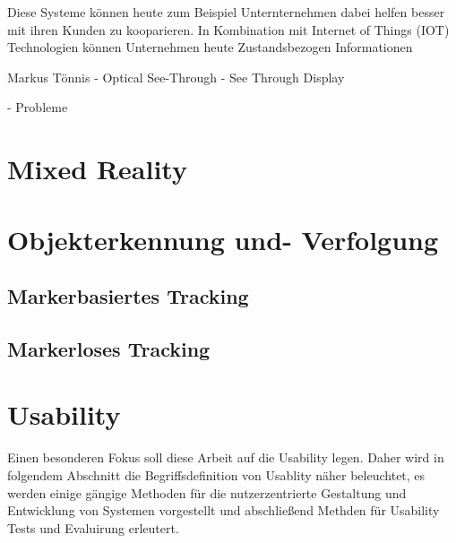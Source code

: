 Diese Systeme können heute zum Beispiel Unternternehmen dabei helfen besser mit ihren Kunden zu kooparieren. In Kombination mit Internet of Things (IOT) Technologien können Unternehmen heute
Zustandsbezogen Informationen  


Markus Tönnis
- Optical See-Through
- See Through Display


-  Probleme

\section{Mixed Reality}



\section{Objekterkennung und- Verfolgung}



\subsection{Markerbasiertes Tracking}



\subsection{Markerloses Tracking}



\section{Usability}

Einen besonderen Fokus soll diese Arbeit auf die Usability legen. Daher wird in folgendem Abschnitt die Begriffsdefinition von Usablity näher beleuchtet, es werden einige 
gängige Methoden für die nutzerzentrierte Gestaltung und Entwicklung von Systemen vorgestellt und abschließend Methden für Usability Tests und Evaluirung erleutert. 

